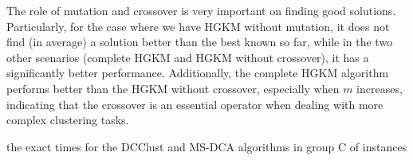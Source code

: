 

The role of mutation and crossover is very important on finding good solutions. Particularly, for the case where we have HGKM without mutation, it does not find (in average) a solution better than the best known so far, while in the two other scenarios (complete HGKM and HGKM without crossover), it has a significantly better performance. Additionally, the complete HGKM algorithm performs better than the HGKM without crossover, especially when $m$ increases, indicating that the crossover is an essential operator when dealing with more complex clustering tasks.

\noindent [TO-DO] the exact times for the DCClust and MS-DCA algorithms in group C of instances

